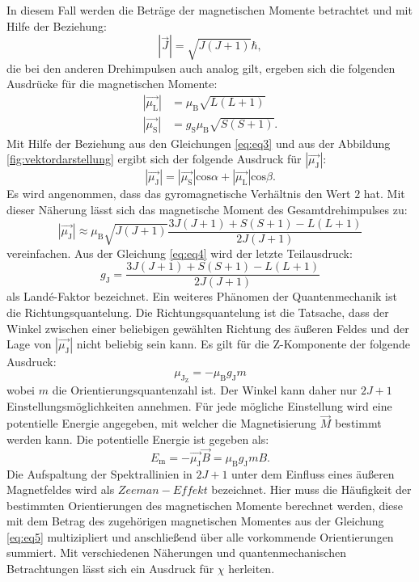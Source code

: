 In diesem Fall werden die Beträge der magnetischen Momente betrachtet und mit Hilfe der Beziehung:
\begin{equation*}
\left|\vec{J}\right| = \sqrt{J(J+1)}\hbar,
\end{equation*}
die bei den anderen Drehimpulsen auch analog gilt, ergeben sich die folgenden Ausdrücke für die magnetischen Momente:
\begin{align}
\label{eq:eq3}
\left|\vec{\mu_\text{L}}\right| &= \mu_\text{B}\sqrt{L(L+1)} \\
\left|\vec{\mu_\text{S}}\right| &= g_\text{S}\mu_\text{B}\sqrt{S(S+1)}.
\end{align}
Mit Hilfe der Beziehung aus den Gleichungen \ref{eq:eq3} und aus der Abbildung \ref{fig:vektordarstellung} ergibt sich der folgende Ausdruck für $\left|\vec{\mu_\text{J}}\right|$:
\begin{equation*}
\left|\vec{\mu_\text{J}}\right| = \left|\vec{\mu_\text{S}}\right|\text{cos}\alpha + \left|\vec{\mu_\text{L}}\right|\text{cos}\beta.
\end{equation*}
Es wird angenommen, dass das gyromagnetische Verhältnis den Wert $2$ hat. Mit dieser Näherung lässt sich das magnetische Moment des Gesamtdrehimpulses zu:
\begin{equation}
\label{eq:eq4}
\left|\vec{\mu_\text{J}}\right| \approx \mu_\text{B} \sqrt{J(J+1)} \frac{3J(J+1)+S(S+1)-L(L+1)}{2J(J+1)}
\end{equation}
vereinfachen. Aus der Gleichung \ref{eq:eq4} wird der letzte Teilausdruck:
\begin{equation}
g_\text{J} = \frac{3J(J+1)+S(S+1)-L(L+1)}{2J(J+1)}
\label{eqn:lande}
\end{equation}
als Land\'{e}-Faktor bezeichnet. Ein weiteres Phänomen der Quantenmechanik ist die Richtungsquantelung. Die Richtungsquantelung ist die Tatsache, dass der Winkel zwischen einer beliebigen gewählten Richtung des äußeren Feldes und der Lage von $\left|\vec{\mu_\text{J}}\right|$ nicht beliebig sein kann. Es gilt für die Z-Komponente der folgende Ausdruck:
\begin{equation}
\label{eq:eq5}
\mu_{\text{J}_\text{Z}} = - \mu_\text{B}g_\text{J}m
\end{equation}
wobei $m$ die Orientierungsquantenzahl ist. Der Winkel kann daher nur $2J+1$ Einstellungsmöglichkeiten annehmen. Für jede mögliche Einstellung wird eine potentielle Energie angegeben, mit welcher die Magnetisierung $\vec{M}$ bestimmt werden kann. Die potentielle Energie ist gegeben als:
\begin{equation*}
E_\text{m} = - \vec{\mu_\text{J}}\vec{B} = \mu_\text{B}g_\text{J}mB.
\end{equation*}
Die Aufspaltung der Spektrallinien in $2J+1$ unter dem Einfluss eines äußeren Magnetfeldes wird als $\mathit{Zeeman-Effekt}$ bezeichnet. Hier muss die Häufigkeit der bestimmten Orientierungen des magnetischen Momente berechnet werden, diese mit dem Betrag des zugehörigen magnetischen Momentes aus der Gleichung \ref{eq:eq5} multizipliert und anschließend über alle vorkommende Orientierungen summiert. Mit verschiedenen Näherungen und quantenmechanischen Betrachtungen lässt sich ein Ausdruck für $\chi$ herleiten.

